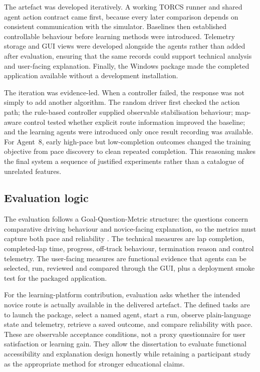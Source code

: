 The artefact was developed iteratively. A working TORCS runner and shared agent action contract came first, because every later comparison depends on consistent communication with the simulator. Baselines then established controllable behaviour before learning methods were introduced. Telemetry storage and GUI views were developed alongside the agents rather than added after evaluation, ensuring that the same records could support technical analysis and user-facing explanation. Finally, the Windows package made the completed application available without a development installation.

The iteration was evidence-led. When a controller failed, the response was not simply to add another algorithm. The random driver first checked the action path; the rule-based controller supplied observable stabilisation behaviour; map-aware control tested whether explicit route information improved the baseline; and the learning agents were introduced only once result recording was available. For Agent~8, early high-pace but low-completion outcomes changed the training objective from pace discovery to clean repeated completion. This reasoning makes the final system a sequence of justified experiments rather than a catalogue of unrelated features.

\subsection{Evaluation logic}

The evaluation follows a Goal-Question-Metric structure: the questions concern comparative driving behaviour and novice-facing explanation, so the metrics must capture both pace and reliability \parencite{basili1994}. The technical measures are lap completion, completed-lap time, progress, off-track behaviour, termination reason and control telemetry. The user-facing measures are functional evidence that agents can be selected, run, reviewed and compared through the GUI, plus a deployment smoke test for the packaged application.

For the learning-platform contribution, evaluation asks whether the intended novice route is actually available in the delivered artefact. The defined tasks are to launch the package, select a named agent, start a run, observe plain-language state and telemetry, retrieve a saved outcome, and compare reliability with pace. These are observable acceptance conditions, not a proxy questionnaire for user satisfaction or learning gain. They allow the dissertation to evaluate functional accessibility and explanation design honestly while retaining a participant study as the appropriate method for stronger educational claims.


